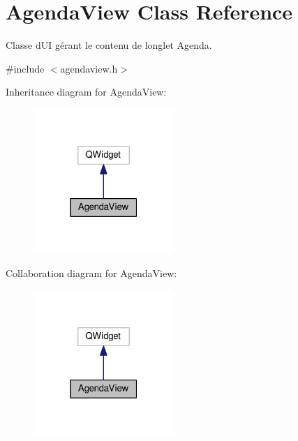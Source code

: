 \hypertarget{class_agenda_view}{}\section{Agenda\+View Class Reference}
\label{class_agenda_view}


Classe d\textquotesingle{}U\+I gérant le contenu de l\textquotesingle{}onglet Agenda.  




{\ttfamily \#include $<$agendaview.\+h$>$}



Inheritance diagram for Agenda\+View\+:\nopagebreak
\begin{figure}[H]
\begin{center}
\leavevmode
\includegraphics[width=151pt]{class_agenda_view__inherit__graph}
\end{center}
\end{figure}


Collaboration diagram for Agenda\+View\+:\nopagebreak
\begin{figure}[H]
\begin{center}
\leavevmode
\includegraphics[width=151pt]{class_agenda_view__coll__graph}
\end{center}
\end{figure}
